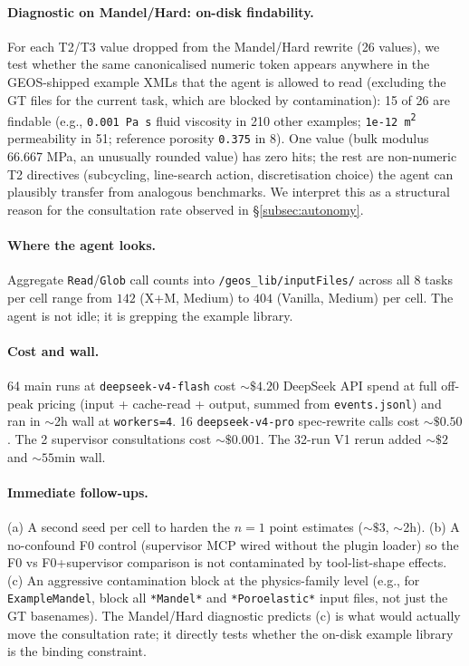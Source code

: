 \documentclass{article}
\begin{document}
\paragraph{Diagnostic on Mandel/Hard: on-disk findability.} For each T2/T3 value dropped from the Mandel/Hard rewrite (26 values), we test whether the same canonicalised numeric token appears anywhere in the GEOS-shipped example XMLs that the agent is allowed to read (excluding the GT files for the current task, which are blocked by contamination): 15 of 26 are findable (e.g., \texttt{0.001 Pa\,s} fluid viscosity in 210 other examples; \texttt{1e-12 m\textsuperscript{2}} permeability in 51; reference porosity \texttt{0.375} in 8). One value (bulk modulus 66.667 MPa, an unusually rounded value) has zero hits; the rest are non-numeric T2 directives (subcycling, line-search action, discretisation choice) the agent can plausibly transfer from analogous benchmarks. We interpret this as a structural reason for the consultation rate observed in \S\ref{subsec:autonomy}.

\paragraph{Where the agent looks.} Aggregate \texttt{Read}/\texttt{Glob} call counts into \texttt{/geos\_lib/inputFiles/} across all 8 tasks per cell range from $142$ (X+M, Medium) to $404$ (Vanilla, Medium) per cell. The agent is not idle; it is grepping the example library.

\paragraph{Cost and wall.} 64 main runs at \texttt{deepseek-v4-flash} cost ${\sim}\$4.20$ DeepSeek API spend at full off-peak pricing (input + cache-read + output, summed from \texttt{events.jsonl}) and ran in $\sim$2h wall at \texttt{workers=4}. 16 \texttt{deepseek-v4-pro} spec-rewrite calls cost ${\sim}\$0.50$. The 2 supervisor consultations cost ${\sim}\$0.001$. The 32-run V1 rerun added ${\sim}\$2$ and ${\sim}55$min wall.

\paragraph{Immediate follow-ups.} (a) A second seed per cell to harden the $n=1$ point estimates ($\sim\$3$, $\sim$2h). (b) A no-confound F0 control (supervisor MCP wired without the plugin loader) so the F0 vs F0+supervisor comparison is not contaminated by tool-list-shape effects. (c) An aggressive contamination block at the physics-family level (e.g., for \texttt{ExampleMandel}, block all \texttt{*Mandel*} and \texttt{*Poroelastic*} input files, not just the GT basenames). The Mandel/Hard diagnostic predicts (c) is what would actually move the consultation rate; it directly tests whether the on-disk example library is the binding constraint.
\end{document}
